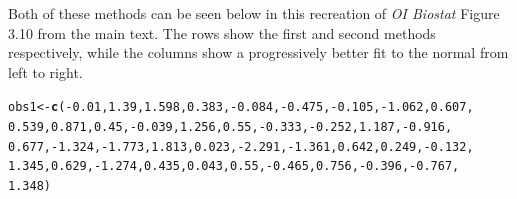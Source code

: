\documentclass{report}\usepackage[]{graphicx}\usepackage[]{color}
\makeatletter
\newcommand{\hlnum}[1]{\textcolor[rgb]{0.686,0.059,0.569}{#1}}%
\newcommand{\hlopt}[1]{\textcolor[rgb]{0,0,0}{#1}}%
\newcommand{\hlstd}[1]{\textcolor[rgb]{0.345,0.345,0.345}{#1}}%
\newcommand{\hlkwb}[1]{\textcolor[rgb]{0.69,0.353,0.396}{#1}}%
\newcommand{\hlkwd}[1]{\textcolor[rgb]{0.737,0.353,0.396}{\textbf{#1}}}%
\newenvironment{kframe}{%
 \def\at@end@of@kframe{}%
 \ifinner\ifhmode%
  \def\at@end@of@kframe{\end{minipage}}%
  \begin{minipage}{\columnwidth}%
 \fi\fi%
 \def\FrameCommand##1{\hskip\@totalleftmargin \hskip-\fboxsep
 \colorbox{shadecolor}{##1}\hskip-\fboxsep
     \hskip-\linewidth \hskip-\@totalleftmargin \hskip\columnwidth}%
 \MakeFramed {\advance\hsize-\width
   \@totalleftmargin\z@ \linewidth\hsize
   \@setminipage}}%
 {\par\unskip\endMakeFramed%
 \at@end@of@kframe}
\newenvironment{knitrout}{}{} %
\makeatother
\begin{document}
Both of these methods can be seen below in this recreation of \textit{OI Biostat} Figure 3.10 from the main text.  The rows show the first and second methods respectively, while the columns show a progressively better fit to the normal from left to right.  
\begin{knitrout}
\color{fgcolor}\begin{kframe}
\begin{alltt}
\hlstd{obs1} \hlkwb{<-} \hlkwd{c}\hlstd{(}\hlopt{-}\hlnum{0.01}\hlstd{,} \hlnum{1.39}\hlstd{,} \hlnum{1.598}\hlstd{,} \hlnum{0.383}\hlstd{,} \hlopt{-}\hlnum{0.084}\hlstd{,} \hlopt{-}\hlnum{0.475}\hlstd{,} \hlopt{-}\hlnum{0.105}\hlstd{,} \hlopt{-}\hlnum{1.062}\hlstd{,} \hlnum{0.607}\hlstd{,}
    \hlnum{0.539}\hlstd{,} \hlnum{0.871}\hlstd{,} \hlnum{0.45}\hlstd{,} \hlopt{-}\hlnum{0.039}\hlstd{,} \hlnum{1.256}\hlstd{,} \hlnum{0.55}\hlstd{,} \hlopt{-}\hlnum{0.333}\hlstd{,} \hlopt{-}\hlnum{0.252}\hlstd{,} \hlnum{1.187}\hlstd{,} \hlopt{-}\hlnum{0.916}\hlstd{,}
    \hlnum{0.677}\hlstd{,} \hlopt{-}\hlnum{1.324}\hlstd{,} \hlopt{-}\hlnum{1.773}\hlstd{,} \hlnum{1.813}\hlstd{,} \hlnum{0.023}\hlstd{,} \hlopt{-}\hlnum{2.291}\hlstd{,} \hlopt{-}\hlnum{1.361}\hlstd{,} \hlnum{0.642}\hlstd{,} \hlnum{0.249}\hlstd{,} \hlopt{-}\hlnum{0.132}\hlstd{,}
    \hlnum{1.345}\hlstd{,} \hlnum{0.629}\hlstd{,} \hlopt{-}\hlnum{1.274}\hlstd{,} \hlnum{0.435}\hlstd{,} \hlnum{0.043}\hlstd{,} \hlnum{0.55}\hlstd{,} \hlopt{-}\hlnum{0.465}\hlstd{,} \hlnum{0.756}\hlstd{,} \hlopt{-}\hlnum{0.396}\hlstd{,} \hlopt{-}\hlnum{0.767}\hlstd{,}
    \hlnum{1.348}\hlstd{)}


\end{alltt}
\end{kframe}
\end{knitrout}
\end{document}
